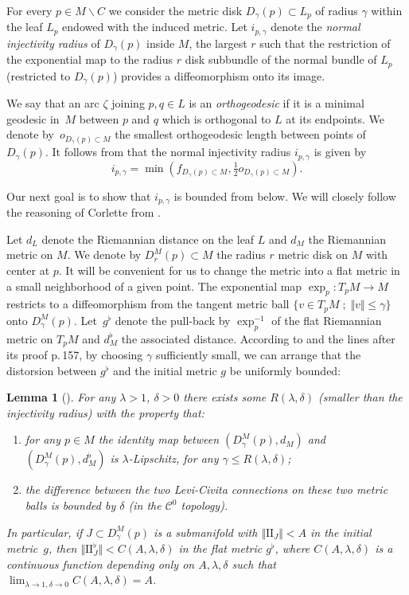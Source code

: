 \documentclass[JEP,XML,SOM,Unicode]{cedram}
\let\mathcal\mathscr
\let\moins\smallsetminus
\newcommand{\II}{\mathrm{II}}
\let\parallel\Vert
\newcommand{\sep}{\;;\;}
\newtheorem{lemma}[theorem]{Lemma}
\theoremstyle{definition}
\theoremstyle{remark}
\numberwithin{equation}{section}
\begin{document}
For every $p\in M\moins C$ we consider the metric disk $D_{\gamma}(p)\subset L_p$ of radius
$\gamma$ within the leaf $L_p$ endowed with the induced metric.
Let $i_{p, \gamma}$ denote the \emph{normal injectivity radius} of $D_{\gamma}(p)$ inside $M$, \ie the largest $r$ such that the restriction of the
exponential map to the radius $r$ disk subbundle of the normal bundle of $L_p$ (restricted to $D_{\gamma}(p)$) provides a diffeomorphism onto its image.

We say that an arc $\zeta$ joining $p,q\in L$ is an \emph{orthogeodesic} if it is a minimal geodesic in~$M$ between $p$ and $q$ which is orthogonal
to $L$ at its endpoints. We denote by~$o_{D_{\gamma}(p)\subset M}$ the smallest orthogeodesic length between points of $D_{\gamma}(p)$.
It follows from \cite[Th.\,4.2]{Herm} that the normal injectivity radius $i_{p,\gamma}$ is given by
\[ i_{p,\gamma}= \min(f_{D_{\gamma}(p)\subset M}, \tfrac12 o_{D_{\gamma}(p)\subset M}). \]

Our next goal is to show that $ i_{p,\gamma}$ is bounded from below. We will closely follow the reasoning of Corlette from
\cite{Cor}.

Let $d_L$ denote the Riemannian distance on the leaf $L$ and $d_M$ the Riemannian metric on $M$.
We denote by $D^M_{r}(p)\subset M$ the radius $r$ metric disk on $M$ with center at $p$.
It will be convenient for us to change the metric into a flat metric in a small neighborhood of a given point. The exponential map $\exp_p: T_pM \to M$
restricts to a diffeomorphism from the tangent metric ball $\{v \in T_pM\sep \parallel v \parallel \leq \gamma\}$ onto $D^M_{\gamma}(p)$.
Let~$g^{\flat}$ denote the pull-back by $\exp_p^{-1}$ of the flat Riemannian metric on $T_pM$ and $d^{\flat}_M$ the associated distance.
According to \cite[Lem.\,2.1]{Cor} and the lines after its proof p.\,157, by choosing $\gamma$ sufficiently small, we can arrange that the distorsion
between $g^{\flat}$ and the initial metric $g$ be uniformly bounded:

\begin{lemma}[{\cite[Lem.\,2.1]{Cor}}]\label{flatdeform}
For any $\lambda >1$, $\delta>0$ there exists some $R(\lambda,\delta)$ (smaller than the injectivity radius) with the property that:
\begin{enumerate}
\item
for any $p\in M$ the identity map between $(D^M_{\gamma}(p), d_M)$ and $(D^M_{\gamma}(p), d^{\flat}_M)$ is
$\lambda$-Lipschitz, for any $\gamma \leq R(\lambda, \delta)$;
\item the difference
between the two Levi-Civita connections on these two metric balls is bounded by
$\delta$ (in the $\mathcal C^0$ topology).
\end{enumerate}
In particular, if $J\subset D^M_{\gamma}(p)$ is a submanifold with $\parallel \II_J\parallel < A$ in the initial metric~$g$, then
$\parallel \II^{\flat}_J\parallel < C(A,\lambda, \delta)$ in the flat metric $g^{\flat}$, where $ C(A,\lambda, \delta)$ is a continuous function
depending only on $A, \lambda, \delta$ such that $\lim_{\lambda \to 1, \delta\to 0}C(A,\lambda,\delta)=A$.
\end{lemma}
\end{document}

